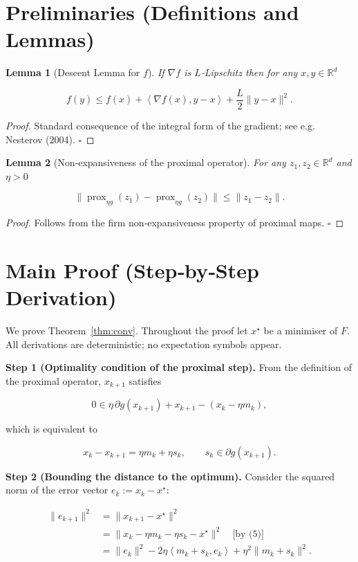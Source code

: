 \documentclass{article}
\newtheorem{lemma}{Lemma}
\newcommand{\prox}{\operatorname{prox}}
\newcommand{\R}{\mathbb{R}}
\newcommand{\inner}[2]{\left\langle #1,#2\right\rangle}
\begin{document}
\newpage
\section*{Preliminaries (Definitions and Lemmas)}
\begin{lemma}[Descent Lemma for $f$]\label{lem:descent}
If $\nabla f$ is $L$‑Lipschitz then for any $x,y\in\R^{d}$  

\[
f(y)\le f(x)+\inner{\nabla f(x)}{y-x}+\frac{L}{2}\|y-x\|^{2}.
\tag{3}
\]
\end{lemma}
\begin{proof}
Standard consequence of the integral form of the gradient; see e.g. Nesterov (2004). \hfill $\square$
\end{proof}

\begin{lemma}[Non‑expansiveness of the proximal operator]\label{lem:prox}
For any $z_{1},z_{2}\in\R^{d}$ and $\eta>0$  

\[
\|\prox_{\eta g}(z_{1})-\prox_{\eta g}(z_{2})\|\le\|z_{1}-z_{2}\|.
\tag{4}
\]
\end{lemma}
\begin{proof}
Follows from the firm non‑expansiveness property of proximal maps. \hfill $\square$
\end{proof}

\section*{Main Proof (Step‑by‑Step Derivation)}
We prove Theorem~\ref{thm:conv}. Throughout the proof let $x^{\star}$ be a minimiser of $F$.
All derivations are deterministic; no expectation symbols appear.

\noindent\textbf{Step 1 (Optimality condition of the proximal step).}  
From the definition of the proximal operator, $x_{k+1}$ satisfies  

\[
0\in \eta\,\partial g(x_{k+1})+x_{k+1}-(x_{k}-\eta m_{k}),
\]

which is equivalent to  

\[
x_{k}-x_{k+1}= \eta m_{k}+ \eta s_{k},\qquad s_{k}\in\partial g(x_{k+1}). \tag{5}
\]

\noindent\textbf{Step 2 (Bounding the distance to the optimum).}  
Consider the squared norm of the error vector $e_{k}:=x_{k}-x^{\star}$:

\[
\begin{aligned}
\|e_{k+1}\|^{2}
&= \|x_{k+1}-x^{\star}\|^{2}\\
&= \|x_{k}-\eta m_{k}-\eta s_{k}-x^{\star}\|^{2}\quad\text{[by (5)]}\\
&= \|e_{k}\|^{2}-2\eta\inner{m_{k}+s_{k}}{e_{k}}+\eta^{2}\|m_{k}+s_{k}\|^{2}. \tag{6}
\end{aligned}
\]
\end{document}
